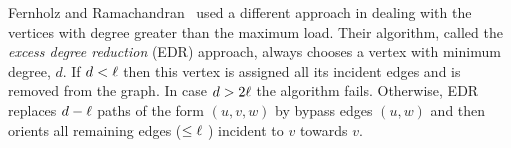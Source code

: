 Fernholz and Ramachandran~\cite{1283432} used a different approach in dealing with the vertices with degree greater than the maximum load.  Their algorithm, called the \emph{excess degree reduction} (EDR) approach, always chooses a vertex with minimum degree, $d$. If $d<\ell$ then this vertex is assigned all its incident edges and is removed from the graph. In case $d>2\ell$ the algorithm fails. Otherwise, EDR replaces $d-\ell$ paths of the form
$(u, v, w)$ by bypass edges $(u, w)$ and then orients all remaining edges ($\le \ell$ ) incident to $v$
towards $v$.

%
%
%

